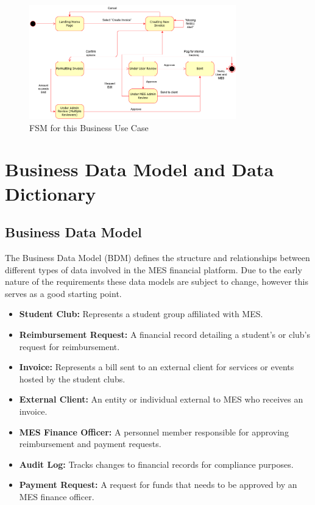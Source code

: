 \documentclass[12pt]{article}
\begin{document}
\begin{itemize}
    \begin{figure}[h!]
        \centering
        \includegraphics[width=0.8\textwidth]{./imgs/case diagram 2.png}
        \caption{FSM for this Business Use Case}
    \end{figure}
\end{itemize}

\section{Business Data Model and Data Dictionary}
\subsection{Business Data Model}
The Business Data Model (BDM) defines the structure and relationships between different types of data involved in the MES financial platform. Due to the early nature of the requirements these data models are subject to change, however this serves as a good starting point.

\begin{itemize}
    \item \textbf{Student Club:} Represents a student group affiliated with MES.
    \item \textbf{Reimbursement Request:} A financial record detailing a student's or club's request for reimbursement.
    \item \textbf{Invoice:} Represents a bill sent to an external client for services or events hosted by the student clubs.
    \item \textbf{External Client:} An entity or individual external to MES who receives an invoice.
    \item \textbf{MES Finance Officer:} A personnel member responsible for approving reimbursement and payment requests.
    \item \textbf{Audit Log:} Tracks changes to financial records for compliance purposes.
    \item \textbf{Payment Request:} A request for funds that needs to be approved by an MES finance officer.
\end{itemize}
\end{document}

